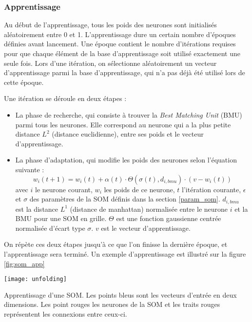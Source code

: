 \subsubsection{Apprentissage}

	Au début de l'apprentissage, tous les poids des neurones sont initialisés aléatoirement entre 0 et 1. L'apprentissage dure un certain nombre d'époques définies avant lancement. Une époque contient le nombre d'itérations requises pour que chaque élément de la base d'apprentissage soit utilisé exactement une seule fois. Lors d'une itération, on sélectionne aléatoirement un vecteur d'apprentissage parmi la base d'apprentissage, qui n'a pas déjà été utilisé lors de cette époque. 

	Une itération se déroule en deux étapes : 
	\begin{itemize}
		\item La phase de recherche, qui consiste à trouver la \textit{Best Matching Unit} (BMU) parmi tous les neurones. Elle correspond au neurone qui a la plus petite distance $L^2$ (distance euclidienne), entre ses poids et le vecteur d'apprentissage.
		\item La phase d'adaptation, qui modifie les poids des neurones selon l'équation suivante :
		\begin{equation}\label{eq:SOM}
			w_i(t+1) = w_i(t)+\alpha(t)\cdot\Theta(\sigma(t),d_{i,bmu})\cdot(v-w_i(t))
		\end{equation} avec $i$ le neurone courant, $w_i$ les poids de ce neurone, $t$ l'itération courante, $\epsilon$ et $\sigma$ des paramètres de la SOM définis dans la section \ref{param_som}. $d_{i, bmu}$ est la distance $L^1$ (distance de manhattan) normalisée entre le neurone $i$ et la BMU pour une SOM en grille. $\Theta$ est une fonction gaussienne centrée normalisée d'écart type $\sigma$. $v$ est le vecteur d'apprentissage.
	\end{itemize}

	On répète ces deux étapes jusqu'à ce que l'on finisse la dernière époque, et l'apprentissage sera terminé. Un exemple d'apprentissage est illustré sur la figure \ref{fig:som_app}

	\begin{figureth}
		\texttt{[image: unfolding]}
		\caption[Apprentissage de SOM]{Apprentissage d'une SOM. Les points bleus sont les vecteurs d'entrée en deux dimensions. Les point rouges les neurones de la SOM et les traits rouges représentent les connexions entre ceux-ci.}\label{fig:som_app}
	\end{figureth}


